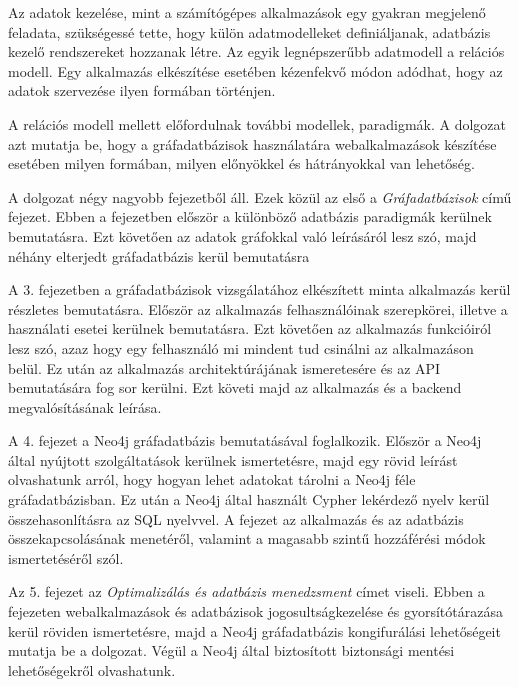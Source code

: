 
Az adatok kezelése, mint a számítógépes alkalmazások egy gyakran megjelenő feladata, szükségessé tette, hogy  külön adatmodelleket definiáljanak, adatbázis kezelő rendszereket hozzanak létre.
Az egyik legnépszerűbb adatmodell a relációs modell. Egy alkalmazás elkészítése esetében kézenfekvő módon adódhat, hogy az adatok szervezése ilyen formában történjen.

A relációs modell mellett előfordulnak további modellek, paradigmák. A dolgozat azt mutatja be, hogy a gráfadatbázisok használatára webalkalmazások készítése esetében milyen formában, milyen előnyökkel és hátrányokkal van lehetőség.





A dolgozat négy nagyobb fejezetből áll. Ezek közül az első a \textit{Gráfadatbázisok} című fejezet.
Ebben a fejezetben először a különböző adatbázis paradigmák kerülnek bemutatásra. Ezt követően az adatok gráfokkal való leírásáról lesz szó, majd néhány elterjedt gráfadatbázis kerül bemutatásra

\bigskip

A 3. fejezetben a gráfadatbázisok vizsgálatához elkészített minta alkalmazás kerül részletes bemutatásra. Először az alkalmazás felhasználóinak szerepkörei, illetve a használati esetei kerülnek bemutatásra. Ezt követően az alkalmazás funkcióiról lesz szó, azaz hogy egy felhasználó mi mindent tud csinálni az alkalmazáson belül. Ez után az alkalmazás architektúrájának ismeretesére és az API bemutatására fog sor kerülni. Ezt követi majd az alkalmazás és a backend megvalósításának leírása.

\bigskip

A 4. fejezet a Neo4j gráfadatbázis bemutatásával foglalkozik. Először a Neo4j által nyújtott szolgáltatások kerülnek ismertetésre, majd egy rövid leírást olvashatunk arról, hogy hogyan lehet adatokat tárolni a Neo4j féle gráfadatbázisban. Ez után a Neo4j által használt Cypher lekérdező nyelv kerül összehasonlításra az SQL nyelvvel. A fejezet az alkalmazás és az adatbázis összekapcsolásának menetéről, valamint a magasabb szintű hozzáférési módok ismertetéséről szól.

\bigskip

Az 5. fejezet az \textit{Optimalizálás és adatbázis menedzsment} címet viseli. Ebben a fejezeten webalkalmazások és adatbázisok jogosultságkezelése és gyorsítótárazása kerül röviden ismertetésre, majd a Neo4j gráfadatbázis kongifurálási lehetőségeit mutatja be a dolgozat. Végül a Neo4j által biztosított biztonsági mentési lehetőségekről olvashatunk.
